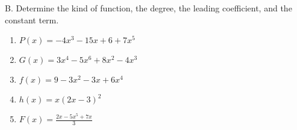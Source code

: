 B. Determine the kind of function, the degree, the leading coefficient, and the constant term. 

\begin{enumerate}[label = \arabic*. ]
\item \hspce \hspce $P(x) =-4x^3-15x+6+7x^5$
\vspce 
\item \hspce \hspce $G(x) =3x^4-5x^6+8x^2-4x^3$
\vspce 
\item \hspce \hspce $f(x) =9-3x^2-3x+6x^4$
\vspce 
\item \hspce \hspce $h(x) =x(2x-3)^2$
\vspce 
\item \hspce \hspce $F(x) =\displaystyle \frac{2x-5x^5+7x}{3} $
\end{enumerate} 
 
